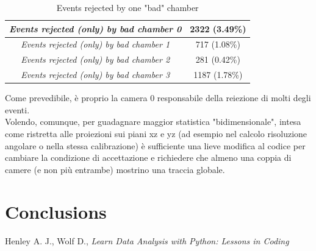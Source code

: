 \documentclass[a4paper,11pt]{book}
\begin{document}
\begin{table}[htbp]
\centering
\begin{tabular}{c|c}
\toprule
\textit{Events rejected (only) by bad chamber 0} & 2322 (3.49\%) \\
\midrule
\textit{Events rejected (only) by bad chamber 1} & 717 (1.08\%) \\
\midrule
\textit{Events rejected (only) by bad chamber 2} & 281 (0.42\%) \\
\midrule
\textit{Events rejected (only) by bad chamber 3} & 1187 (1.78\%) \\
\bottomrule
\end{tabular}
\caption{Events rejected by one "bad" chamber}
\label{tab:rejected_chamber}
\end{table}

Come prevedibile, è proprio la camera 0 responsabile della reiezione di molti degli eventi.\\

Volendo, comunque, per guadagnare maggior statistica "bidimensionale", intesa come ristretta alle proiezioni sui piani xz e yz (ad esempio nel calcolo risoluzione angolare o nella stessa calibrazione) è sufficiente una lieve modifica al codice per cambiare la condizione di accettazione e richiedere che almeno una coppia di camere (e non più entrambe) mostrino una traccia globale.\\ 




\chapter{Conclusions}













\clearpage

\begin{thebibliography}{1}
 Henley A. J., Wolf D., \textit{Learn Data Analysis with Python: Lessons in Coding}
\end{thebibliography}
\end{document}
